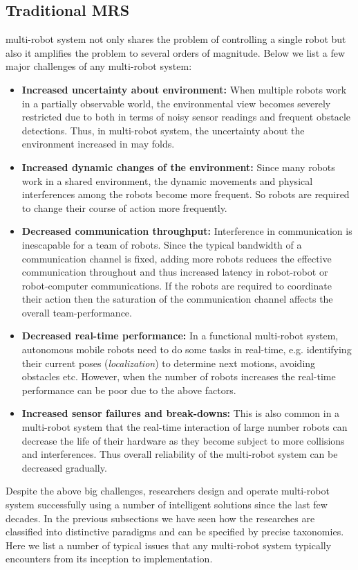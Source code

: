\subsection{Traditional MRS}
\label{bg:mrs:mrs}
multi-robot system not only shares the problem of controlling a single robot but also it amplifies the problem to several orders of magnitude. Below we list a few major challenges of any multi-robot system:
\begin{itemize}
\item \textbf{Increased uncertainty about environment:}
When multiple robots work in a partially observable world, the environmental view becomes severely restricted due to both in terms of noisy sensor readings and frequent obstacle detections. Thus, in multi-robot system, the uncertainty about the environment increased in may folds.
%
\item \textbf{Increased dynamic changes of the environment:}
Since many robots work in a shared environment, the dynamic movements and physical interferences among the robots become more frequent. So robots are required to change their course of action more frequently.
% 
\item \textbf{Decreased communication throughput:}
Interference in communication is inescapable for a team of robots. Since the typical bandwidth of a communication channel is fixed, adding more robots reduces the effective communication throughout and thus increased latency in robot-robot or robot-computer communications. If the robots are required to coordinate their action then the saturation of the communication channel affects the overall team-performance.
%
\item \textbf{Decreased real-time performance:}
In a functional multi-robot system, autonomous mobile robots need to do some tasks in real-time, e.g. identifying their current poses ({\em localization}) to determine next motions, avoiding obstacles etc. However, when the number of robots increases the real-time performance can be poor due to the above factors.
%
\item \textbf{Increased sensor failures and break-downs:}
This is also common in a multi-robot system that the real-time interaction of large number robots can decrease the life of their hardware as they become subject to more collisions and interferences. Thus overall reliability of the multi-robot system can be decreased gradually.
\end{itemize}
Despite the above big challenges, researchers design and operate multi-robot system successfully using a number of intelligent solutions since the last few decades. In the previous subsections we have seen how the researches are classified into distinctive paradigms and can be specified by precise taxonomies. Here we list a number of typical issues that any multi-robot system typically encounters from its inception to implementation.
